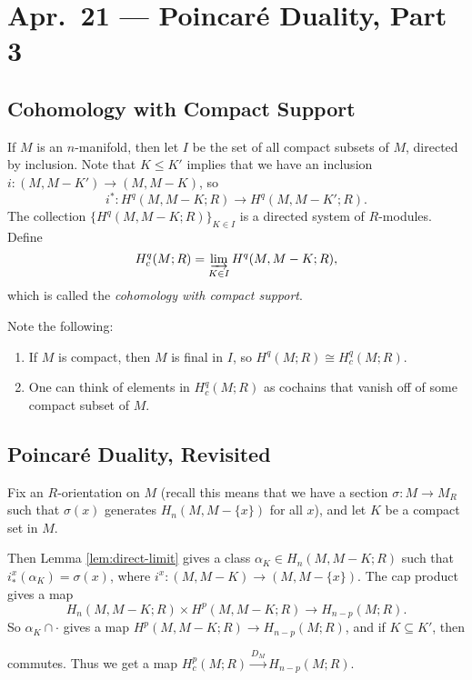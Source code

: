 \chapter{Apr.~21 --- Poincar\'e Duality, Part 3}

\section{Cohomology with Compact Support}

\begin{definition}
  If $M$ is an $n$-manifold, then let
  $I$ be the set of all compact subsets of
  $M$, directed by inclusion. Note that
  $K \le K'$ implies that we have
  an inclusion $i : (M, M - K') \to (M, M - K)$, so
  \[
    i^* : H^q(M, M - K; R)
    \longrightarrow H^q(M, M - K'; R).
  \]
  The collection $\{H^q(M, M - K; R)\}_{K \in I}$
  is a directed system of $R$-modules.
  Define
  \[
    H^q_c(M; R) = \varinjlim_{K \in I} H^q(M, M - K; R),
  \]
  which is called the
  \emph{cohomology with compact support}.
\end{definition}

\begin{remark}
  Note the following:
  \begin{enumerate}
    \item If $M$ is compact, then
      $M$ is final in $I$, so
      $H^q(M; R) \cong H^q_c(M; R)$.
    \item One can think of elements
      in $H^q_c(M; R)$ as cochains
      that vanish off of some compact
      subset of $M$.
  \end{enumerate}
\end{remark}

\section{Poincar\'e Duality, Revisited}
\begin{remark}
  Fix an $R$-orientation on $M$ (recall
  this means that we have a section
  $\sigma : M \to M_R$ such that $\sigma(x)$
  generates $H_n(M, M - \{x\})$ for all
  $x$), and let $K$ be a compact
  set in $M$.

  Then Lemma \ref{lem:direct-limit}
  gives a class $\alpha_K \in H_n(M, M - K; R)$
  such that $i^x_*(\alpha_K) = \sigma(x)$,
  where $i^x : (M, M - K) \to (M, M - \{x\})$. The cap product gives
  a map
  \[
    H_n(M, M - K; R) \times H^p(M, M - K; R)
    \longrightarrow
    H_{n - p}(M; R).
  \]
  So $\alpha_K \cap \cdot$ gives a map
  $H^p(M, M - K; R) \to H_{n - p}(M; R)$,
  and if $K \subseteq K'$, then
  \begin{center}
  \end{center}
  commutes.
  Thus we get a map $H^p_c(M; R) \overset{D_M}{\longrightarrow} H_{n - p}(M; R)$.
\end{remark}

